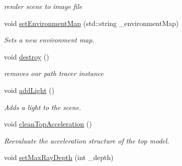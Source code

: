 \begin{DoxyCompactItemize}
\begin{DoxyCompactList}\small\item\em render scene to image file \end{DoxyCompactList}\item 
\hypertarget{class_path_tracer_scene_a60a7dde523ef5873fef1a6f48492c274}{void \hyperlink{class_path_tracer_scene_a60a7dde523ef5873fef1a6f48492c274}{set\-Environment\-Map} (std\-::string \-\_\-environment\-Map)}\label{class_path_tracer_scene_a60a7dde523ef5873fef1a6f48492c274}

\begin{DoxyCompactList}\small\item\em Sets a new environment map. \end{DoxyCompactList}\item 
\hypertarget{class_path_tracer_scene_add93884ceb6909b3c19f78ecd6916eed}{void \hyperlink{class_path_tracer_scene_add93884ceb6909b3c19f78ecd6916eed}{destroy} ()}\label{class_path_tracer_scene_add93884ceb6909b3c19f78ecd6916eed}

\begin{DoxyCompactList}\small\item\em removes our path tracer instance \end{DoxyCompactList}\item 
\hypertarget{class_path_tracer_scene_a02f2f4a4adf5b435f3b87d731b93b0c8}{void \hyperlink{class_path_tracer_scene_a02f2f4a4adf5b435f3b87d731b93b0c8}{add\-Light} ()}\label{class_path_tracer_scene_a02f2f4a4adf5b435f3b87d731b93b0c8}

\begin{DoxyCompactList}\small\item\em Adds a light to the scene. \end{DoxyCompactList}\item 
\hypertarget{class_path_tracer_scene_a0888079f72be5e9cc893173029f4581a}{void \hyperlink{class_path_tracer_scene_a0888079f72be5e9cc893173029f4581a}{clean\-Top\-Acceleration} ()}\label{class_path_tracer_scene_a0888079f72be5e9cc893173029f4581a}

\begin{DoxyCompactList}\small\item\em Reevaluate the acceleration structure of the top model. \end{DoxyCompactList}\item 
\hypertarget{class_path_tracer_scene_a5e3cf9c3b16a8e9a87ec88d937d6c47e}{void \hyperlink{class_path_tracer_scene_a5e3cf9c3b16a8e9a87ec88d937d6c47e}{set\-Max\-Ray\-Depth} (int \-\_\-depth)}\label{class_path_tracer_scene_a5e3cf9c3b16a8e9a87ec88d937d6c47e}


\end{DoxyCompactItemize}

